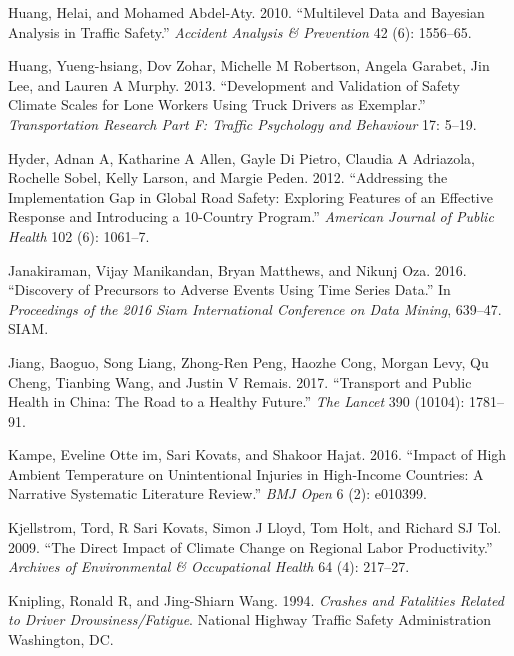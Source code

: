 \documentclass[12pt]{book}
\numberwithin{equation}{chapter}
\begin{document}
\leavevmode\hypertarget{ref-huang2010multilevel}{}%
Huang, Helai, and Mohamed Abdel-Aty. 2010. ``Multilevel Data and Bayesian Analysis in Traffic Safety.'' \emph{Accident Analysis \& Prevention} 42 (6): 1556--65.

\leavevmode\hypertarget{ref-huang2013development}{}%
Huang, Yueng-hsiang, Dov Zohar, Michelle M Robertson, Angela Garabet, Jin Lee, and Lauren A Murphy. 2013. ``Development and Validation of Safety Climate Scales for Lone Workers Using Truck Drivers as Exemplar.'' \emph{Transportation Research Part F: Traffic Psychology and Behaviour} 17: 5--19.

\leavevmode\hypertarget{ref-hyder2012addressing}{}%
Hyder, Adnan A, Katharine A Allen, Gayle Di Pietro, Claudia A Adriazola, Rochelle Sobel, Kelly Larson, and Margie Peden. 2012. ``Addressing the Implementation Gap in Global Road Safety: Exploring Features of an Effective Response and Introducing a 10-Country Program.'' \emph{American Journal of Public Health} 102 (6): 1061--7.

\leavevmode\hypertarget{ref-janakiraman2016discovery}{}%
Janakiraman, Vijay Manikandan, Bryan Matthews, and Nikunj Oza. 2016. ``Discovery of Precursors to Adverse Events Using Time Series Data.'' In \emph{Proceedings of the 2016 Siam International Conference on Data Mining}, 639--47. SIAM.

\leavevmode\hypertarget{ref-jiang2017transport}{}%
Jiang, Baoguo, Song Liang, Zhong-Ren Peng, Haozhe Cong, Morgan Levy, Qu Cheng, Tianbing Wang, and Justin V Remais. 2017. ``Transport and Public Health in China: The Road to a Healthy Future.'' \emph{The Lancet} 390 (10104): 1781--91.

\leavevmode\hypertarget{ref-im2016impact}{}%
Kampe, Eveline Otte im, Sari Kovats, and Shakoor Hajat. 2016. ``Impact of High Ambient Temperature on Unintentional Injuries in High-Income Countries: A Narrative Systematic Literature Review.'' \emph{BMJ Open} 6 (2): e010399.

\leavevmode\hypertarget{ref-kjellstrom2009direct}{}%
Kjellstrom, Tord, R Sari Kovats, Simon J Lloyd, Tom Holt, and Richard SJ Tol. 2009. ``The Direct Impact of Climate Change on Regional Labor Productivity.'' \emph{Archives of Environmental \& Occupational Health} 64 (4): 217--27.

\leavevmode\hypertarget{ref-knipling1994crashes}{}%
Knipling, Ronald R, and Jing-Shiarn Wang. 1994. \emph{Crashes and Fatalities Related to Driver Drowsiness/Fatigue}. National Highway Traffic Safety Administration Washington, DC.
\end{document}
